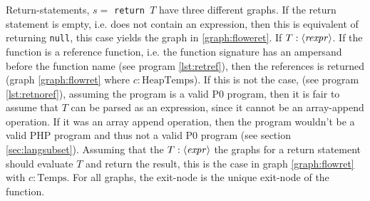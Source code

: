 \begin{graph}
{\begin{adjustbox}{max size={.25\textwidth}{.25\textheight}}
\end{adjustbox}}\hfill%
\hspace*{\fill}
\end{graph}

Return-statements, $s =$ \texttt{return $T$} have three different graphs. If the return statement is empty, i.e. does not contain an expression, then this is equivalent of returning \texttt{null}, this case yields the graph in \ref{graph:floweret}. If $T : \langle\mathit{rexpr}\rangle$. If the function is a reference function, i.e. the function signature has an ampersand before the function name (see program \ref{lst:retref}), then the references is returned (graph \ref{graph:flowret} where $c : \text{HeapTemps}$). If this is not the case, (see program \ref{lst:retnoref}), assuming the program is a valid P0 program, then it is fair to assume that $T$ can be parsed as an expression, since it cannot be an array-append operation. If it was an array append operation, then the program wouldn't be a valid PHP program and thus not a valid P0 program (see section \ref{sec:langsubset}). Assuming that the $T : \langle\mathit{expr}\rangle$ the graphs for a return statement should evaluate $T$ and return the result, this is the case in graph \ref{graph:flowret} with $c : \text{Temps}$.  For all graphs, the exit-node is the unique exit-node of the function.

